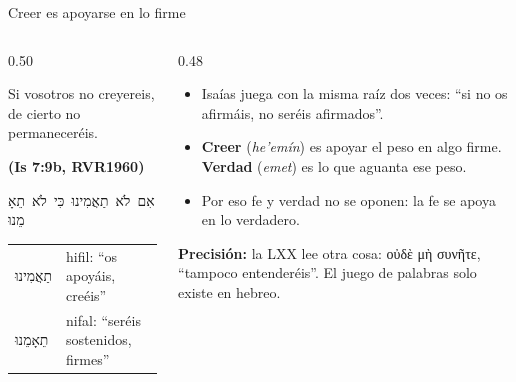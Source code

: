 \documentclass[hyperref={bookmarks=false},aspectratio=169]{beamer}
\newcommand{\heb}[1]{\mbox{\foreignlanguage{hebrew}{#1}}}
\newcommand{\grc}[1]{\foreignlanguage{ancientgreek}{#1}}
\newcommand{\fuente}[1]{\par\hfill{\upshape\bfseries\footnotesize\textcolor{azul}{#1}}}
\newcommand{\destacar}[1]{\textbf{\textcolor{azul}{#1}}}
\newcommand{\precision}[1]{{\footnotesize\color{gris}\textbf{Precisión:} #1}}
\begin{document}
\begin{frame}{Creer es apoyarse en lo firme}
\begin{columns}[c,onlytextwidth]
\begin{column}{0.50\textwidth}
\begin{cita}Si vosotros no creyereis, de cierto no permaneceréis.\fuente{(Is 7:9b, RVR1960)}\end{cita}
\begin{center}\heb{אִם לֹא תַאֲמִינוּ כִּי לֹא תֵאָמֵנוּ}\end{center}
\scriptsize\renewcommand{\arraystretch}{1.12}
\begin{tabular}{@{}>{\RaggedRight\arraybackslash}p{1.8cm}>{\RaggedRight\arraybackslash}p{4.0cm}@{}}
\toprule
\heb{תַאֲמִינוּ} & hifil: ``os apoyáis, creéis'' \\
\heb{תֵאָמֵנוּ} & nifal: ``seréis sostenidos, firmes'' \\
\bottomrule
\end{tabular}
\end{column}
\begin{column}{0.48\textwidth}\small
\begin{itemize}
\item Isaías juega con la misma raíz dos veces: ``si no os afirmáis, no seréis afirmados''.
\item \destacar{Creer} (\emph{he'emín}) es apoyar el peso en algo firme. \destacar{Verdad} (\emph{emet}) es lo que aguanta ese peso.
\item Por eso fe y verdad no se oponen: la fe se apoya en lo verdadero.
\end{itemize}
\precision{la LXX lee otra cosa: \grc{οὐδὲ μὴ συνῆτε}, ``tampoco entenderéis''. El juego de palabras solo existe en hebreo.}
\end{column}
\end{columns}
\end{frame}
\end{document}

